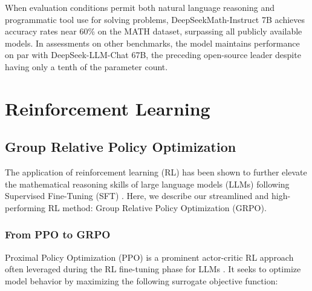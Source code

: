 When evaluation conditions permit both natural language reasoning and programmatic tool use for solving problems, DeepSeekMath-Instruct 7B achieves accuracy rates near 60\% on the MATH dataset, surpassing all publicly available models. In assessments on other benchmarks, the model maintains performance on par with DeepSeek-LLM-Chat 67B, the preceding open-source leader despite having only a tenth of the parameter count.

\section{Reinforcement Learning}

\subsection{Group Relative Policy Optimization}

The application of reinforcement learning (RL) has been shown to further elevate the mathematical reasoning skills of large language models (LLMs) following Supervised Fine-Tuning (SFT) \citep{wang2023math,wizardmath}. Here, we describe our streamlined and high-performing RL method: Group Relative Policy Optimization (GRPO).

\subsubsection{From PPO to GRPO} Proximal Policy Optimization (PPO) \citep{schulman2017proximal} is a prominent actor-critic RL approach often leveraged during the RL fine-tuning phase for LLMs \citep{ouyang2022training}. It seeks to optimize model behavior by maximizing the following surrogate objective function:

